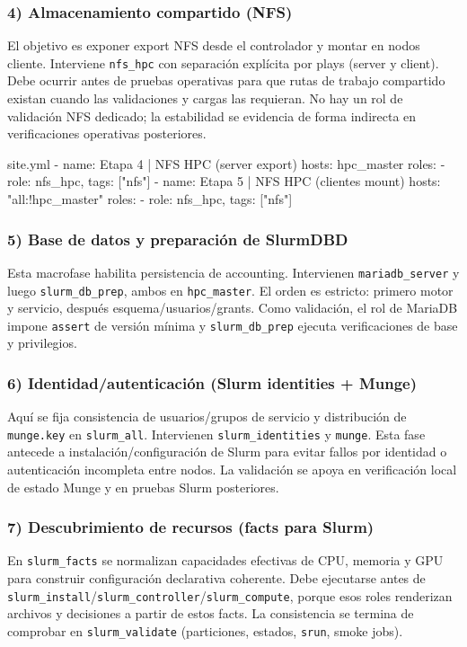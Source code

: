 \subsubsection*{4) Almacenamiento compartido (NFS)}
El objetivo es exponer export NFS desde el controlador y montar en nodos cliente. Interviene \texttt{nfs\_hpc} con separación explícita por plays (server y client). Debe ocurrir antes de pruebas operativas para que rutas de trabajo compartido existan cuando las validaciones y cargas las requieran. No hay un rol de validación NFS dedicado; la estabilidad se evidencia de forma indirecta en verificaciones operativas posteriores.

\begin{filecode}{site.yml}
- name: Etapa 4 | NFS HPC (server export)
  hosts: hpc_master
  roles:
    - { role: nfs_hpc, tags: ["nfs"] }
- name: Etapa 5 | NFS HPC (clientes mount)
  hosts: "all:!hpc_master"
  roles:
    - { role: nfs_hpc, tags: ["nfs"] }
\end{filecode}

\subsubsection*{5) Base de datos y preparación de SlurmDBD}
Esta macrofase habilita persistencia de accounting. Intervienen \texttt{mariadb\_server} y luego \texttt{slurm\_db\_prep}, ambos en \texttt{hpc\_master}. El orden es estricto: primero motor y servicio, después esquema/usuarios/grants. Como validación, el rol de MariaDB impone \texttt{assert} de versión mínima y \texttt{slurm\_db\_prep} ejecuta verificaciones de base y privilegios.

\subsubsection*{6) Identidad/autenticación (Slurm identities + Munge)}
Aquí se fija consistencia de usuarios/grupos de servicio y distribución de \texttt{munge.key} en \texttt{slurm\_all}. Intervienen \texttt{slurm\_identities} y \texttt{munge}. Esta fase antecede a instalación/configuración de Slurm para evitar fallos por identidad o autenticación incompleta entre nodos. La validación se apoya en verificación local de estado Munge y en pruebas Slurm posteriores.

\subsubsection*{7) Descubrimiento de recursos (facts para Slurm)}
En \texttt{slurm\_facts} se normalizan capacidades efectivas de CPU, memoria y GPU para construir configuración declarativa coherente. Debe ejecutarse antes de \texttt{slurm\_install}/\texttt{slurm\_controller}/\texttt{slurm\_compute}, porque esos roles renderizan archivos y decisiones a partir de estos facts. La consistencia se termina de comprobar en \texttt{slurm\_validate} (particiones, estados, \texttt{srun}, smoke jobs).

